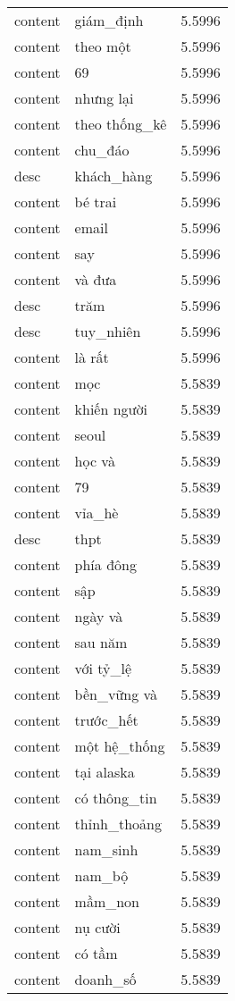 \documentclass{article}
\begin{document}
\begin{tabular}{lll}
content & giám\_định & 5.5996\\
content & theo một & 5.5996\\
content & 69 & 5.5996\\
content & nhưng lại & 5.5996\\
content & theo thống\_kê & 5.5996\\
content & chu\_đáo & 5.5996\\
desc & khách\_hàng & 5.5996\\
content & bé trai & 5.5996\\
content & email & 5.5996\\
content & say & 5.5996\\
content & và đưa & 5.5996\\
desc & trăm & 5.5996\\
desc & tuy\_nhiên & 5.5996\\
content & là rất & 5.5996\\
content & mọc & 5.5839\\
content & khiến người & 5.5839\\
content & seoul & 5.5839\\
content & học và & 5.5839\\
content & 79 & 5.5839\\
content & vỉa\_hè & 5.5839\\
desc & thpt & 5.5839\\
content & phía đông & 5.5839\\
content & sập & 5.5839\\
content & ngày và & 5.5839\\
content & sau năm & 5.5839\\
content & với tỷ\_lệ & 5.5839\\
content & bền\_vững và & 5.5839\\
content & trước\_hết & 5.5839\\
content & một hệ\_thống & 5.5839\\
content & tại alaska & 5.5839\\
content & có thông\_tin & 5.5839\\
content & thỉnh\_thoảng & 5.5839\\
content & nam\_sinh & 5.5839\\
content & nam\_bộ & 5.5839\\
content & mầm\_non & 5.5839\\
content & nụ cười & 5.5839\\
content & có tầm & 5.5839\\
content & doanh\_số & 5.5839\\

\end{tabular}
\end{document}
